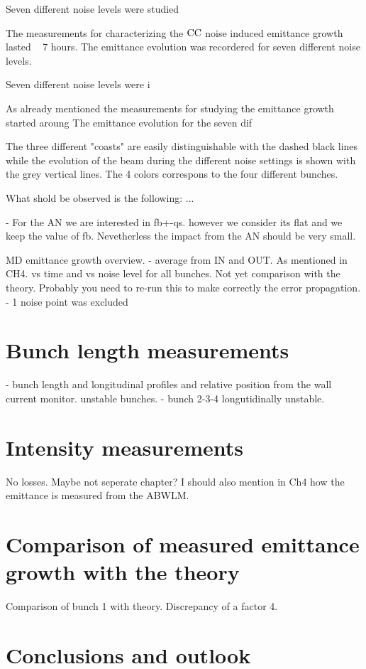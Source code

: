 Seven different noise levels were studied

The measurements for characterizing the ${\mathrm{CC}}$ noise induced emittance growth lasted ~ 7 hours. The emittance evolution was recordered for seven different noise levels. 

Seven different noise levels were i


As already mentioned the measurements for studying the emittance growth started aroung
The emittance evolution for the seven dif

The three different "coasts" are easily distinguishable with the dashed black lines while the evolution of the beam during the different noise settings is shown with the grey vertical lines. The 4 colors correspons to the four different bunches. 

What shold be observed is the following: ...



- For the AN we are interested in fb+-qs. however we consider its flat and we keep the value of fb. Nevetherless the impact from the AN should be very small.

MD emittance growth overview. 
    - average from IN and OUT. As mentioned in CH4. vs time and vs noise level for all bunches. Not yet comparison with the theory. Probably you need to re-run this to make correctly the error propagation. 
    - 1 noise point was excluded
 


\section{Bunch length measurements}\label{sec:bunch_length_measurements_2018}
    - bunch length and longitudinal profiles and relative position from the wall current monitor.  unstable bunches.
    - bunch 2-3-4 longutidinally unstable.
 
\section{Intensity measurements}\label{sec:intensity_measurements_2018}
No losses. Maybe not seperate chapter?
I should also mention in Ch4 how the emittance is measured from the ABWLM.

\section{Comparison of measured emittance growth with the theory}\label{sec:meas_2018_vs_theory}

Comparison of bunch 1 with theory. Discrepancy of a factor 4.


 \section{Conclusions and outlook}\label{sec:MD2018_summary}
